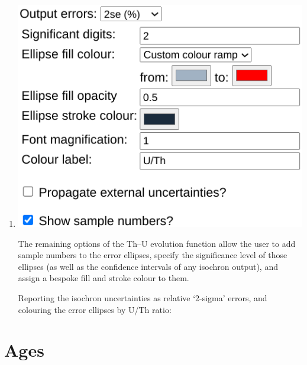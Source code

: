 \begin{refsection}
\begin{enumerate}
\item\begin{minipage}[t]{.5\linewidth}
    \strut\vspace*{-\baselineskip}\newline
    \includegraphics[width=\linewidth]{../figures/ThUevolutionOtherOptions.png}
  \end{minipage}
  \begin{minipage}[t]{.5\linewidth}
    The remaining options of the Th--U evolution function allow the
    user to add sample numbers to the error ellipses, specify the
    significance level of those ellipses (as well as the confidence
    intervals of any isochron output), and assign a bespoke fill and
    stroke colour to them.
  \end{minipage}

  Reporting the isochron uncertainties as relative `2-sigma' errors,
  and colouring the error ellipses by U/Th ratio:


\end{enumerate}

\section{Ages}\label{sec:ThU-ages-R}


\end{refsection}
